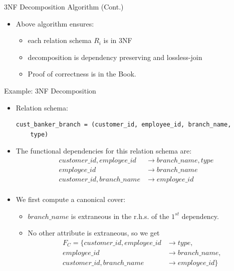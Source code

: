 \documentclass{beamer}
\begin{document}
\begin{frame}{3NF Decomposition Algorithm (Cont.)}
    \begin{itemize}
        \item Above algorithm ensures:
        \begin{itemize}
            \item each relation schema $R_i$ is in 3NF
            \item decomposition is dependency preserving and lossless-join
            \item Proof of correctness is in the Book.
        \end{itemize}
    \end{itemize}
\end{frame}

\begin{frame}[fragile]{Example: 3NF Decomposition}
    \footnotesize
    \begin{itemize}
        \item Relation schema:
            \begin{verbatim}
cust_banker_branch = (customer_id, employee_id, branch_name,
    type)
            \end{verbatim}
            \vspace{-5mm}
        \item The functional dependencies for this relation schema are:
            \begin{equation*}
                \begin{align*}
                    customer\_id, employee\_id &\rightarrow branch\_name, type \\
                    employee\_id &\rightarrow branch\_name \\
                    customer\_id, branch\_name &\rightarrow employee\_id \\
                \end{align*}
            \end{equation*}
        \item We first compute a canonical cover:
            \begin{itemize}
                \item $branch\_name$ is extraneous in the r.h.s. of the $1^{st}$ dependency.
                \item No other attribute is extraneous, so we get
                    \begin{equation*}
                        \begin{align*}
                            F_C = \{ customer\_id, employee\_id & \rightarrow type, \\
                                  employee\_id & \rightarrow branch\_name, \\
                                  customer\_id, branch\_name & \rightarrow employee\_id \}
                        \end{align*}
                    \end{equation*}
            \end{itemize}
    \end{itemize}
\end{frame}
\end{document}
